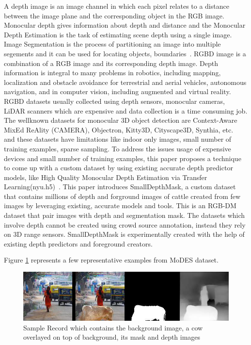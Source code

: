 \documentclass{article}
\begin{document}
A depth image is an image channel in which each pixel relates to a distance between the image plane and the corresponding object in the RGB image. Monocular depth gives information about depth and distance and the Monocular Depth Estimation is the task of estimating scene depth using a single image\cite{abuolaim2020defocus}. 
Image Segmentation is the process of partitioning an image into multiple segements and it can be used for locating objects, boundaries~\cite{amza2012review}. 
RGBD image is a combination of a RGB image and its corresponding depth image\cite{zhang2018deep}.
 Depth information is integral to many problems in
robotics, including mapping, localization and obstacle avoidance for terrestrial and aerial vehicles, autonomous navigation, and in computer vision,
 including augmented and virtual reality\cite{marchand2015pose}. RGBD datasets usually collected using depth sensors, monocular cameras, 
 LiDAR scanners which are expensive and data collection is a time consuming job. The wellknown datasets for monocular 3D object detection are Context-Aware MixEd ReAlity (CAMERA), Objectron, Kitty3D, Cityscape3D, Synthia, etc.~\cite{} and these datasets have limitations like indoor only images, small number of training examples, sparse sampling. To address the issues usage of expensive devices and small number of training examples, this paper proposes a technique to come up with a custom dataset 
 by using existing accurate depth predictor models, like High Quality Monocular Depth Estimation via Transfer Learning(nyu.h5)~\cite{alhashim2018high}. This paper introduces SmallDepthMask, 
 a custom dataset that contains millions of depth and forground images of cattle created from few images by leveraging existing, 
 accurate models and tools. This is an RGB-DM dataset that pair images with depth and segmentation mask. The datasets which involve depth cannot be 
 created using crowd source annotation, instead they rely on 3D range sensors. SmallDepthMask is experimentally created with the help of existing 
 depth predictors and foreground creators.

Figure \ref{fig:sampledatarecord} represents a few representative examples from MoDES dataset.

\begin{figure}[h!]
\centering
  \includegraphics[width=1\textwidth]{samplerecord.png}
  \caption{Sample Record which contains the background image, a cow overlayed on top of background, its mask and depth images}
  \label{fig:sampledatarecord}
\end{figure}
\end{document}
